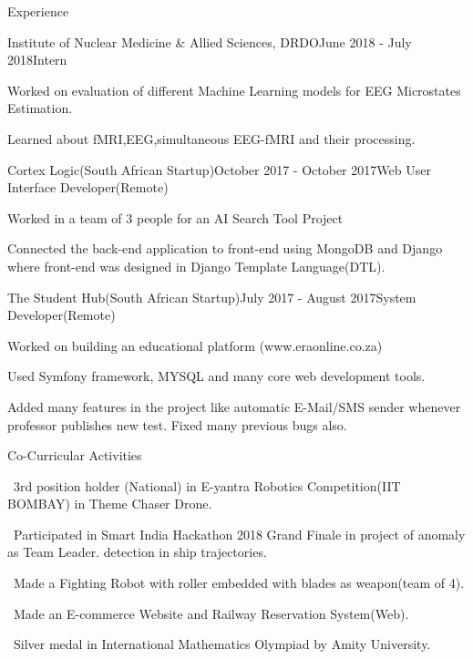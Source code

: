 \documentclass{resume} %
\begin{document}
\begin{rSection}{Experience}

\begin{rSubsection}{Institute of Nuclear Medicine \& Allied Sciences, DRDO}{June 2018 - July 2018}{Intern}{}
\item Worked on evaluation of different Machine Learning models for EEG Microstates Estimation.
\item Learned about fMRI,EEG,simultaneous EEG-fMRI and their processing.
\end{rSubsection}



\begin{rSubsection}{Cortex Logic(South African Startup)}{October 2017 - October 2017}{Web User Interface Developer(Remote)}{}
\item Worked in a team of 3 people for an AI Search Tool Project
\item Connected the back-end application to front-end using MongoDB and Django where front-end was designed in Django Template Language(DTL).
\end{rSubsection}


\begin{rSubsection}{The Student Hub(South African Startup)}{July 2017 - August 2017}{System Developer(Remote)}{}
	\item Worked on building an educational platform (www.eraonline.co.za)
	\item Used Symfony framework, MYSQL and many core web development tools.
	\item Added many features in the project like automatic E-Mail/SMS sender
	whenever professor publishes new test. Fixed many previous bugs also.
\\	
\end{rSubsection}

\end{rSection}


\begin{rSection}{Co-Curricular Activities} \itemsep -2pt
\item \textbullet \ 3rd position holder (National) in E-yantra Robotics Competition(IIT BOMBAY)
in Theme Chaser Drone.
\item \textbullet \ Participated in Smart India Hackathon 2018 Grand Finale in project of anomaly as Team Leader.
detection in ship trajectories.
\item \textbullet \ Made a Fighting Robot with roller embedded with blades as weapon(team of 4).
\item \textbullet \ Made an E-commerce Website and Railway Reservation System(Web).
\item \textbullet \ Silver medal in International Mathematics Olympiad by Amity University.
\end{rSection}
\end{document}
